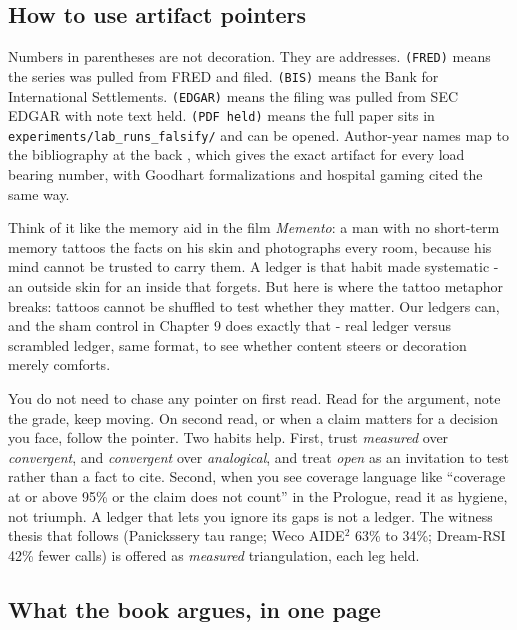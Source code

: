 \subsection*{How to use artifact pointers}

Numbers in parentheses are not decoration. They are addresses. \texttt{(FRED)} means the series was pulled from FRED and filed. \texttt{(BIS)} means the Bank for International Settlements. \texttt{(EDGAR)} means the filing was pulled from SEC EDGAR with note text held. \texttt{(PDF held)} means the full paper sits in \texttt{experiments/lab\_runs\_falsify/} and can be opened. Author-year names map to the bibliography at the back \citep{panickssery2024,shumailov2024}, which gives the exact artifact for every load bearing number, with Goodhart formalizations \citep{goodhart2410,goodhart2505} and hospital gaming \citep{bevan2006} cited the same way.

Think of it like the memory aid in the film \textit{Memento}: a man with no short-term memory tattoos the facts on his skin and photographs every room, because his mind cannot be trusted to carry them. A ledger is that habit made systematic - an outside skin for an inside that forgets. But here is where the tattoo metaphor breaks: tattoos cannot be shuffled to test whether they matter. Our ledgers can, and the sham control in Chapter 9 does exactly that - real ledger versus scrambled ledger, same format, to see whether content steers or decoration merely comforts.

You do not need to chase any pointer on first read. Read for the argument, note the grade, keep moving. On second read, or when a claim matters for a decision you face, follow the pointer. Two habits help. First, trust \textit{measured} over \textit{convergent}, and \textit{convergent} over \textit{analogical}, and treat \textit{open} as an invitation to test rather than a fact to cite. Second, when you see coverage language like ``coverage at or above 95\% or the claim does not count'' in the Prologue, read it as hygiene, not triumph. A ledger that lets you ignore its gaps is not a ledger. The witness thesis that follows (Panickssery tau range; Weco AIDE$^{2}$ 63\% to 34\%; Dream-RSI 42\% fewer calls) is offered as \textit{measured} triangulation, each leg held.

\subsection*{What the book argues, in one page}

